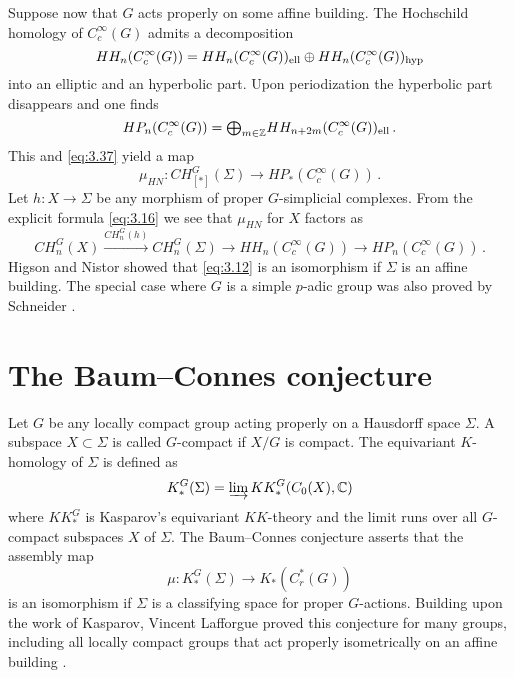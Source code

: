 Suppose now that $G$ acts properly on some affine building. The Hochschild homology 
of $C_c^\infty (G)$ admits a decomposition 
\[
HH_n (C_c^\infty (G)) = HH_n (C_c^\infty (G))_{\mathrm{ell}} \oplus HH_n (C_c^\infty (G))_{\mathrm{hyp}}
\]
into an elliptic and an hyperbolic part. Upon periodization the hyperbolic part
disappears and one finds \cite[Section 7]{HiNi}
\begin{equation}\label{eq:3.17}
HP_n (C_c^\infty (G)) = {\textstyle \bigoplus_{m \in \mathbb Z} } HH_{n + 2m} (C_c^\infty (G))_{\mathrm{ell}} \,.
\end{equation}
This and \eqref{eq:3.37} yield a map 
\begin{equation}\label{eq:3.12}
\mu_{HN} : CH_{[*]}^G (\Sigma ) \to HP_* (C_c^\infty (G)) \,.
\end{equation}
Let $h : X \to \Sigma$ be any morphism of proper $G$-simplicial complexes. 
From the explicit formula \eqref{eq:3.16} we see that $\mu_{HN}$ for $X$ factors as
\begin{equation}\label{eq:3.38}
CH_n^G (X) \xrightarrow{CH_n^G (h)} CH_n^G (\Sigma ) \to HH_n (C_c^\infty (G)) 
\to HP_n (C_c^\infty (G))\,.
\end{equation}
Higson and Nistor \cite{HiNi} showed that \eqref{eq:3.12} is an isomorphism if 
$\Sigma$ is an affine building. The special case where $G$ is a simple $p$-adic 
group was also proved by Schneider \cite{Schn}. 
\vspace{4mm}




\section{The Baum--Connes conjecture}
\label{sec:3.4}

Let $G$ be any locally compact group acting properly on a Hausdorff space $\Sigma$. 
A subspace $X \subset \Sigma$ is called $G$-compact if $X / G$ is compact. 
The equivariant $K$-homology of $\Sigma$ is defined as
\begin{equation}\label{eq:3.18}
K_*^G (\Sigma ) = \varinjlim KK_*^G (C_0 (X), \mathbb C )
\end{equation}
where $KK_*^G$ is Kasparov's equivariant $KK$-theory \cite{Kas}
and the limit runs over all $G$-compact subspaces $X$ of $\Sigma$.
The Baum--Connes conjecture asserts that the assembly map
\begin{equation}\label{eq:3.7}
\mu : K_*^G (\Sigma) \to K_* (C_r^* (G))
\end{equation}
is an isomorphism if $\Sigma$ is a classifying space for proper $G$-actions.
Building upon the work of Kasparov, Vincent Lafforgue proved this conjecture 
for many groups, including all locally compact groups 
that act properly isometrically on an affine building \cite{Laf}.

